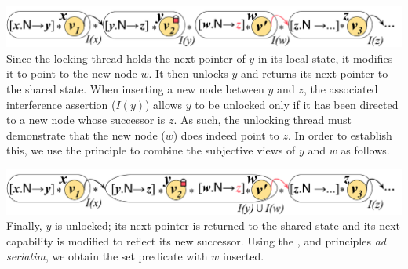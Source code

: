 %
{\centering \includegraphics[scale=0.25]{Sections/Examples/Images/add1.pdf}\\}
%
\noindent Since the locking thread holds the next pointer of $y$ in its local state, it modifies it to point to the new node $w$. It then unlocks $y$ and returns its next pointer to the shared state. When inserting a new node between $y$ and $z$, the associated interference assertion ($I(y)$) allows $y$ to be unlocked only if it has been directed to a new node whose successor is $z$. As such, the unlocking thread must demonstrate that the new node ($w$) does indeed point to $z$. In order to establish this, we use the \mergeRule principle to combine the subjective views of $y$ and $w$ as follows. \vspace{0pt}

%
{\centering \includegraphics[scale=0.25]{Sections/Examples/Images/add2.pdf}\\}
%
\noindent Finally, $y$ is unlocked; its next pointer is returned to the shared state and its next capability is modified to reflect its new successor. Using the \copyRule, \forgetRule and \shiftRule principles \textit{ad seriatim}, we obtain the set predicate with $w$ inserted. \vspace{0pt}

